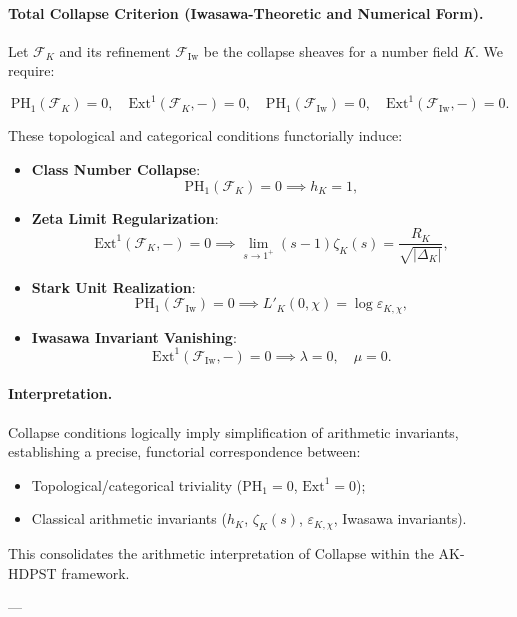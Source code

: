 \documentclass[11pt]{article}
\begin{document}
\paragraph{Total Collapse Criterion (Iwasawa-Theoretic and Numerical Form).}
Let \( \mathcal{F}_K \) and its refinement \( \mathcal{F}_{\mathrm{Iw}} \) be the collapse sheaves for a number field \( K \). We require:

\[
\mathrm{PH}_1(\mathcal{F}_K) = 0, \quad \mathrm{Ext}^1(\mathcal{F}_K, -) = 0, \quad \mathrm{PH}_1(\mathcal{F}_{\mathrm{Iw}}) = 0, \quad \mathrm{Ext}^1(\mathcal{F}_{\mathrm{Iw}}, -) = 0.
\]

These topological and categorical conditions functorially induce:

\begin{itemize}
  \item \textbf{Class Number Collapse}:
  \[
  \mathrm{PH}_1(\mathcal{F}_K) = 0 \implies h_K = 1,
  \]
  \item \textbf{Zeta Limit Regularization}:
  \[
  \mathrm{Ext}^1(\mathcal{F}_K, -) = 0 \implies \lim_{s \to 1^+} (s - 1)\zeta_K(s) = \dfrac{R_K}{\sqrt{|\Delta_K|}},
  \]
  \item \textbf{Stark Unit Realization}:
  \[
  \mathrm{PH}_1(\mathcal{F}_{\mathrm{Iw}}) = 0 \implies L'_K(0,\chi) = \log \varepsilon_{K,\chi},
  \]
  \item \textbf{Iwasawa Invariant Vanishing}:
  \[
  \mathrm{Ext}^1(\mathcal{F}_{\mathrm{Iw}}, -) = 0 \implies \lambda = 0, \quad \mu = 0.
  \]
\end{itemize}

\paragraph{Interpretation.}
Collapse conditions logically imply simplification of arithmetic invariants, establishing a precise, functorial correspondence between:

\begin{itemize}
    \item Topological/categorical triviality (\( \mathrm{PH}_1 = 0 \), \( \mathrm{Ext}^1 = 0 \));
    \item Classical arithmetic invariants (\( h_K \), \( \zeta_K(s) \), \( \varepsilon_{K,\chi} \), Iwasawa invariants).
\end{itemize}

This consolidates the arithmetic interpretation of Collapse within the AK-HDPST framework.

---
\end{document}

